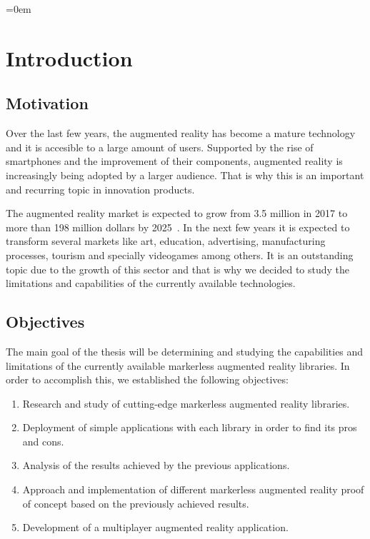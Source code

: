 \parindent=0em
\setcounter{chapter}{0}
\chapter{Introduction}
\noindent
\section{Motivation}
Over the last few years, the augmented reality has become a mature technology and it is accesible to a large amount of users. Supported by the rise of smartphones and the improvement of their components, augmented reality is increasingly being adopted by a larger audience. That is why this is an important and recurring topic in innovation products.

The augmented reality market is expected to grow from 3.5 million in 2017 to more than 198 million dollars by 2025~\cite{Statista}. In the next few years it is expected to transform several markets like art, education, advertising, manufacturing processes, tourism and specially videogames among others. It is an outstanding topic due to the growth of this sector and that is why we decided to study the limitations and capabilities of the currently available technologies.


\section{Objectives}
The main goal of the thesis will be determining and studying the capabilities and limitations of the currently available markerless augmented reality libraries. In order to accomplish this, we established the following objectives:

\begin{enumerate}[label={\arabic*.}]
\item Research and study of cutting-edge markerless augmented reality libraries.
\item Deployment of simple applications with each library in order to find its pros and cons.
\item Analysis of the results achieved by the previous applications.
\item Approach and implementation of different markerless augmented reality proof of concept based on the previously achieved results.
\item Development of a multiplayer augmented reality application.
\end{enumerate}


\newpage
